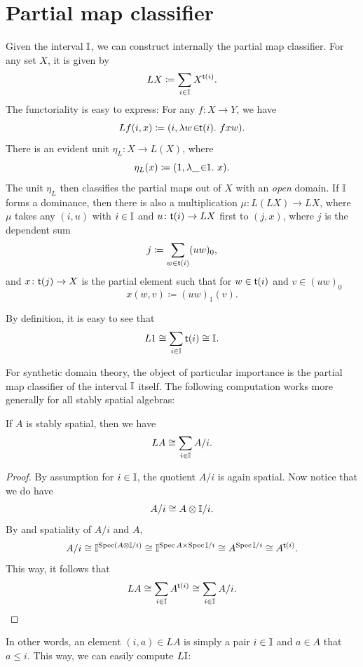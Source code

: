 \section{Partial map classifier}\label{sec:lifting}
Given the interval $\mathbb{I}$, we can construct internally the partial map classifier. For any set $X$, it is given by
\[ L X \coloneq \sum_{i \in \mathbb{I}}X^{\mathsf{t}(i)}\text{.} \]
The functoriality is easy to express: For any $f \colon X \to Y$, we have
\[ L f(i,x) \coloneq (i,\lambda w\!\in\!\!\mathsf{t}(i).\ fxw)\text{.} \]
There is an evident unit $\eta_L \colon X \to L(X)$, where
\[ \eta_L(x) \coloneq (1,\lambda \_\!\in\!\!1.\  x)\text{.} \]
The unit $\eta_L$ then classifies the partial maps out of $X$ with an \emph{open} domain. If $\mathbb{I}$ forms a dominance, then there is also a multiplication $\mu \colon L(L X) \to L X$, where $\mu$ takes any $(i,u)$ with $i \in \mathbb{I}$ and $u \colon \mathsf{t}(i) \to L X$ first to $(j,x)$, where $j$ is the dependent sum
\[ j \coloneq \sum_{w\in\mathsf{t}(i)} (uw)_0\text{,} \]
and $x \colon \mathsf{t}(j) \to X$ is the partial element such that for $w \in \mathsf{t}(i)$ and $v \in (uw)_0$
\[ x(w,v) \coloneq (uw)_1(v)\text{.} \]

\begin{example}
  By definition, it is easy to see that
  \[ L 1 \cong \sum_{i \in \mathbb{I}}\mathsf{t}(i) \cong \mathbb{I}\text{.} \]
\end{example}

For synthetic domain theory, the object of particular importance is the partial map classifier of the interval $\mathbb{I}$ itself. The following computation works more generally for all stably spatial algebras:

\begin{proposition}\label{prop:liftingofalgebra}
  If $A$ is stably spatial, then we have
  \[ L A \cong \sum_{i \in \mathbb{I}}A/i\text{.} \]
\end{proposition}
\begin{proof}
  By assumption for $i \in \mathbb{I}$, the quotient $A/i$ is again spatial. Now notice that we do have
  \[ A/i \cong A \otimes \mathbb{I}/i\text{.} \]
  By  and spatiality of $A/i$ and $A$,
  \[ A/i \cong \mathbb{I}^{\operatorname{Spec}(A \otimes \mathbb{I}/i)} \cong \mathbb{I}^{\operatorname{Spec} A \times \operatorname{Spec}\mathbb{I}/i} \cong A^{\operatorname{Spec} \mathbb{I}/i} \cong A^{\mathsf{t}(i)}\text{.} \]
  This way, it follows that 
  \[ L A \cong \sum_{i \in \mathbb{I}}A^{\mathsf{t}(i)} \cong \sum_{i \in \mathbb{I}}A/i. \qedhere \]
\end{proof}

In other words, an element $(i,a) \in L A$ is simply a pair $i \in \mathbb{I}$ and $a \in A$ that $a \le i$. This way, we can easily compute $L \mathbb{I}$:

